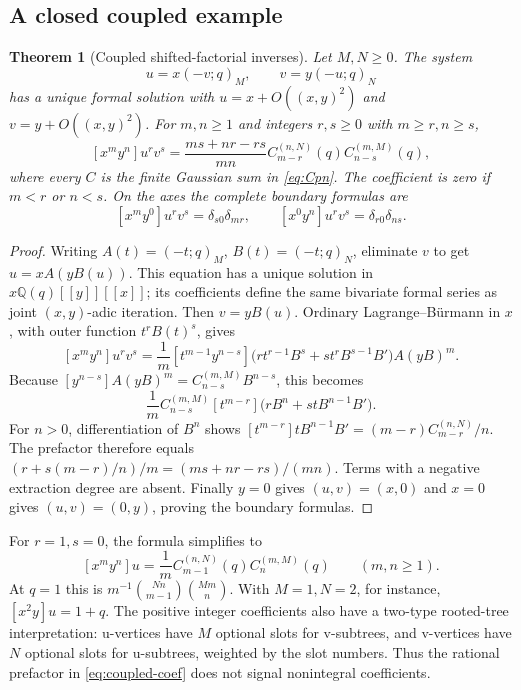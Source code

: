 \documentclass[11pt,a4paper]{article}
\numberwithin{equation}{section}
\newtheorem{theorem}{Theorem}[section]
\theoremstyle{definition}
\theoremstyle{remark}
\newcommand{\Q}{\mathbb Q}
\newcommand{\poch}[3]{(#1;#2)_{#3}}
\begin{document}
\subsection{A closed coupled example}
\begin{theorem}[Coupled shifted-factorial inverses]\label{thm:coupled}
Let $M,N\ge0$. The system
\begin{equation}\label{eq:coupled-system}
 u=x\poch{-v}qM,\qquad v=y\poch{-u}qN
\end{equation}
has a unique formal solution with $u=x+O((x,y)^2)$ and
$v=y+O((x,y)^2)$. For $m,n\ge1$ and integers $r,s\ge0$ with $m\ge r,n\ge s$,
\begin{equation}\label{eq:coupled-coef}
 [x^my^n]u^rv^s
 =\frac{ms+nr-rs}{mn}
          C_{m-r}^{(n,N)}(q)C_{n-s}^{(m,M)}(q),
\end{equation}
where every $C$ is the finite Gaussian sum in \eqref{eq:Cpn}. The coefficient
is zero if $m<r$ or $n<s$.
On the axes the complete boundary formulas are
\begin{equation}\label{eq:coupled-axes}
 [x^my^0]u^rv^s=\delta_{s0}\delta_{mr},\qquad
 [x^0y^n]u^rv^s=\delta_{r0}\delta_{ns}.
\end{equation}
\end{theorem}
\begin{proof}
Writing $A(t)=\poch{-t}qM$, $B(t)=\poch{-t}qN$, eliminate $v$ to get
$u=xA(yB(u))$. This equation has a unique solution in $x\Q(q)[[y]][[x]]$;
its coefficients define the same bivariate formal series as joint
$(x,y)$-adic iteration. Then $v=yB(u)$.
Ordinary Lagrange--B\"urmann in $x$, with outer function $t^rB(t)^s$, gives
\[
 [x^my^n]u^rv^s
 =\frac1m[t^{m-1}y^{n-s}]
   \bigl(rt^{r-1}B^s+st^rB^{s-1}B'\bigr)A(yB)^m.
\]
Because $[y^{n-s}]A(yB)^m=C_{n-s}^{(m,M)}B^{n-s}$, this becomes
\[
 \frac1m C_{n-s}^{(m,M)}
    [t^{m-r}]\bigl(rB^n+stB^{n-1}B'\bigr).
\]
For $n>0$, differentiation of $B^n$ shows
$[t^{m-r}]tB^{n-1}B'=(m-r)C_{m-r}^{(n,N)}/n$.
The prefactor therefore equals
$(r+s(m-r)/n)/m=(ms+nr-rs)/(mn)$.
Terms with a negative extraction degree are absent. Finally $y=0$ gives
$(u,v)=(x,0)$ and $x=0$ gives $(u,v)=(0,y)$, proving the boundary formulas.
\end{proof}

For $r=1,s=0$, the formula simplifies to
\begin{equation}\label{eq:coupled-u}
 [x^my^n]u=\frac1m C_{m-1}^{(n,N)}(q)C_n^{(m,M)}(q)
 \qquad(m,n\ge1).
\end{equation}
At $q=1$ this is $m^{-1}\binom{Nn}{m-1}\binom{Mm}n$.
With $M=1,N=2$, for instance, $[x^2y]u=1+q$.
The positive integer coefficients also have a two-type rooted-tree interpretation:
u-vertices have $M$ optional slots for v-subtrees, and v-vertices have $N$
optional slots for u-subtrees, weighted by the slot numbers. Thus the rational
prefactor in \eqref{eq:coupled-coef} does not signal nonintegral coefficients.
\end{document}
